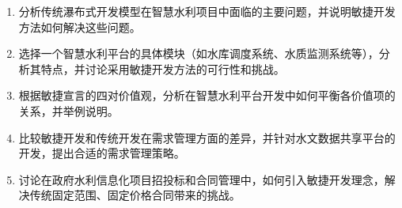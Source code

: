 \begin{enumerate}
\def\labelenumi{\arabic{enumi}.}
\item
  分析传统瀑布式开发模型在智慧水利项目中面临的主要问题，并说明敏捷开发方法如何解决这些问题。
\item
  选择一个智慧水利平台的具体模块（如水库调度系统、水质监测系统等），分析其特点，并讨论采用敏捷开发方法的可行性和挑战。
\item
  根据敏捷宣言的四对价值观，分析在智慧水利平台开发中如何平衡各价值项的关系，并举例说明。
\item
  比较敏捷开发和传统开发在需求管理方面的差异，并针对水文数据共享平台的开发，提出合适的需求管理策略。
\item
  讨论在政府水利信息化项目招投标和合同管理中，如何引入敏捷开发理念，解决传统固定范围、固定价格合同带来的挑战。
\end{enumerate}
